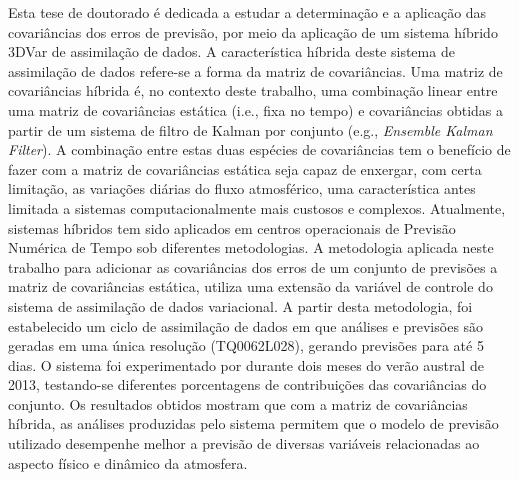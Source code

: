 
\begin{resumo}

\hypertarget{estilo:resumo}{} 

Esta tese de doutorado é dedicada a estudar a determinação e a aplicação das covariâncias dos erros de previsão, por meio da aplicação de um sistema híbrido 3DVar de assimilação de dados. A característica híbrida deste sistema de assimilação de dados refere-se a forma da matriz de covariâncias. Uma matriz de covariâncias híbrida é, no contexto deste trabalho, uma combinação linear entre uma matriz de covariâncias estática (i.e., fixa no tempo) e covariâncias obtidas a partir de um sistema de filtro de Kalman por conjunto (e.g., \textit{Ensemble Kalman Filter}). A combinação entre estas duas espécies de covariâncias tem o benefício de fazer com a matriz de covariâncias estática seja capaz de enxergar, com certa limitação, as variações diárias do fluxo atmosférico, uma característica antes limitada a sistemas computacionalmente mais custosos e complexos. Atualmente, sistemas híbridos tem sido aplicados em centros operacionais de Previsão Numérica de Tempo sob diferentes metodologias. A metodologia aplicada neste trabalho para adicionar as covariâncias dos erros de um conjunto de previsões a matriz de covariâncias estática, utiliza uma extensão da variável de controle do sistema de assimilação de dados variacional. A partir desta metodologia, foi estabelecido um ciclo de assimilação de dados em que análises e previsões são geradas em uma única resolução (TQ0062L028), gerando previsões para até 5 dias. O sistema foi experimentado por durante dois meses do verão austral de 2013, testando-se diferentes porcentagens de contribuições das covariâncias do conjunto. Os resultados obtidos mostram que com a matriz de covariâncias híbrida, as análises produzidas pelo sistema permitem que o modelo de previsão utilizado desempenhe melhor a previsão de diversas variáveis relacionadas ao aspecto físico e dinâmico da atmosfera.

 
\end{resumo}